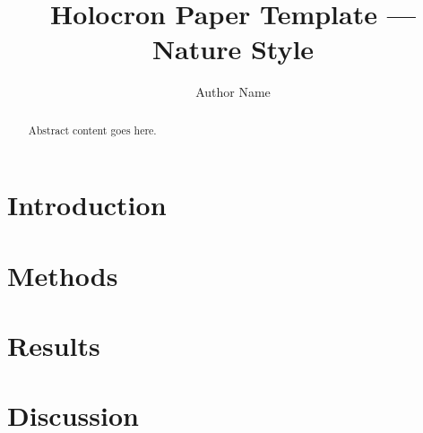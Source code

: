 \documentclass[twocolumn]{article}
\title{Holocron Paper Template — Nature Style}
\author{Author Name}
\begin{document}
\maketitle
\begin{abstract}
Abstract content goes here.
\end{abstract}
\section{Introduction}
\section{Methods}
\section{Results}
\section{Discussion}


\end{document}
